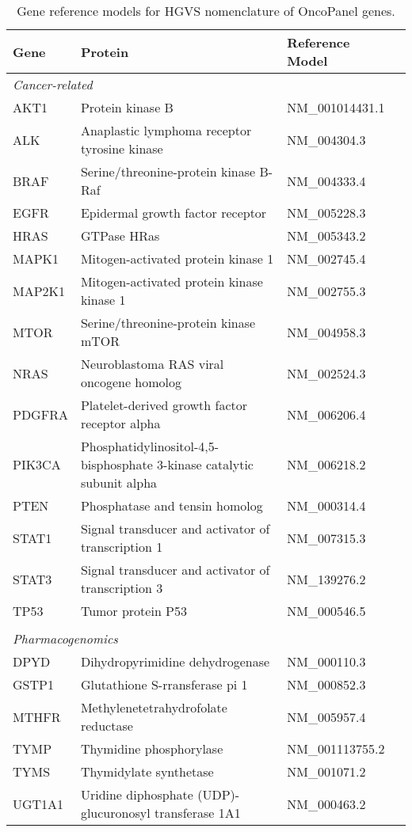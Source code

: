 \normalsize
\begin{table}[H]
    \caption{Gene reference models for HGVS nomenclature of OncoPanel genes.}
    \label{tbl:genemodel}
    \centering
    \begin{tabular}{llll}
    \hline
    Gene & Protein & Reference Model \\
    \hline
    \multicolumn{3}{l}{\textit{Cancer-related}}
    \\
    AKT1 & Protein kinase B & NM\_001014431.1 \\
    ALK & Anaplastic lymphoma receptor tyrosine kinase & NM\_004304.3 \\
    BRAF & Serine/threonine-protein kinase B-Raf & NM\_004333.4 \\
    EGFR & Epidermal growth factor receptor & NM\_005228.3 \\
    HRAS & GTPase HRas & NM\_005343.2 \\
    MAPK1 & Mitogen-activated protein kinase 1 & NM\_002745.4 \\
    MAP2K1 & Mitogen-activated protein kinase kinase 1 & NM\_002755.3 \\
    MTOR & Serine/threonine-protein kinase mTOR & NM\_004958.3 \\
    NRAS & Neuroblastoma RAS viral oncogene homolog & NM\_002524.3 \\
    PDGFRA & Platelet-derived growth factor receptor alpha & NM\_006206.4 \\
    PIK3CA & Phosphatidylinositol-4,5-bisphosphate 3-kinase catalytic subunit alpha & NM\_006218.2 \\
    PTEN & Phosphatase and tensin homolog & NM\_000314.4 \\
    STAT1 & Signal transducer and activator of transcription 1 & NM\_007315.3 \\
    STAT3 & Signal transducer and activator of transcription 3 & NM\_139276.2 \\
    TP53 & Tumor protein P53 & NM\_000546.5 \\
    \\
    \multicolumn{3}{l}{\textit{Pharmacogenomics}}
    \\
    DPYD & Dihydropyrimidine dehydrogenase & NM\_000110.3 \\
    GSTP1 & Glutathione S-rransferase pi 1 & NM\_000852.3 \\
    MTHFR & Methylenetetrahydrofolate reductase & NM\_005957.4 \\
    TYMP & Thymidine phosphorylase & NM\_001113755.2 \\
    TYMS & Thymidylate synthetase & NM\_001071.2 \\
    UGT1A1 & Uridine diphosphate (UDP)-glucuronosyl transferase 1A1 & NM\_000463.2\\
    \hline
    \end{tabular}
\end{table}


